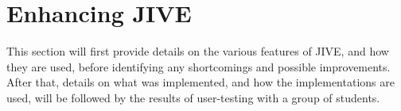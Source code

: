 \chapter{Enhancing JIVE}\label{jiveEnhance}

This section will first provide details on the various features of JIVE, and how they are used, before identifying any shortcomings and possible improvements.
After that, details on what was implemented, and how the implementations are used, will be followed by the results of user-testing with a group of students.






